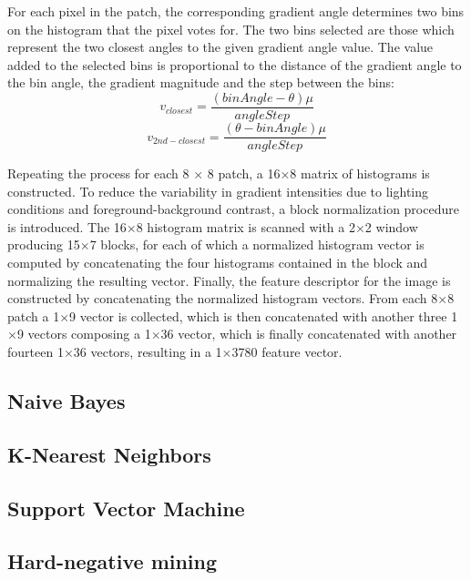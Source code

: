 \documentclass[journal,twocolumn]{IEEEtran}
\begin{document}
For each pixel in the patch, the corresponding gradient angle
determines two bins on the histogram that the pixel votes for.
The two bins selected are those which represent the two closest
angles to the given gradient angle value. The value added to
the selected bins is proportional to the distance of the gradient
angle to the bin angle, the gradient magnitude and the step
between the bins:
\begin{equation*}
v_{closest}=\frac{(binAngle-\theta)\mu}{angleStep}
\end{equation*}
\begin{equation*}
v_{2nd-closest}=\frac{(\theta-binAngle)\mu}{angleStep}
\end{equation*}

Repeating the process for each 8 × 8 patch, a 16$\times$8 matrix
of histograms is constructed.
To reduce the variability in gradient intensities due to lighting conditions and foreground-background contrast, a block
normalization procedure is introduced. The 16$\times$8 histogram
matrix is scanned with a 2$\times$2 window producing 15$\times$7 blocks,
for each of which a normalized histogram vector is computed
by concatenating the four histograms contained in the block
and normalizing the resulting vector.
Finally, the feature descriptor for the image is constructed
by concatenating the normalized histogram vectors. From
each 8$\times$8 patch a 1$\times$9 vector is collected, which is then
concatenated with another three 1$\times$9 vectors composing a
1$\times$36 vector, which is finally concatenated with another
fourteen 1$\times$36 vectors, resulting in a 1$\times$3780 feature vector.


\subsection{Naive Bayes}

\subsection{K-Nearest Neighbors}

\subsection{Support Vector Machine}

\subsection{Hard-negative mining}
\end{document}
